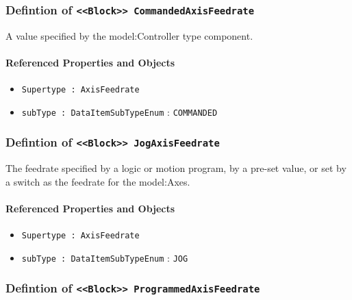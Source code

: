 \subsubsection{Defintion of \texttt{<<Block>> CommandedAxisFeedrate}}
  \label{type:CommandedAxisFeedrate}

\FloatBarrier

A value specified by the {model:Controller} type component.

\FloatBarrier
\paragraph{Referenced Properties and Objects}

\begin{itemize}
\item \texttt{Supertype : AxisFeedrate}

\item \texttt{subType : DataItemSubTypeEnum} : \texttt{COMMANDED}

\end{itemize}
\FloatBarrier
\subsubsection{Defintion of \texttt{<<Block>> JogAxisFeedrate}}
  \label{type:JogAxisFeedrate}

\FloatBarrier

The feedrate specified by a logic or motion program, by a pre-set value, or set by a switch as the feedrate for the {model:Axes}. 

\FloatBarrier
\paragraph{Referenced Properties and Objects}

\begin{itemize}
\item \texttt{Supertype : AxisFeedrate}

\item \texttt{subType : DataItemSubTypeEnum} : \texttt{JOG}

\end{itemize}
\FloatBarrier
\subsubsection{Defintion of \texttt{<<Block>> ProgrammedAxisFeedrate}}
  \label{type:ProgrammedAxisFeedrate}

\FloatBarrier

